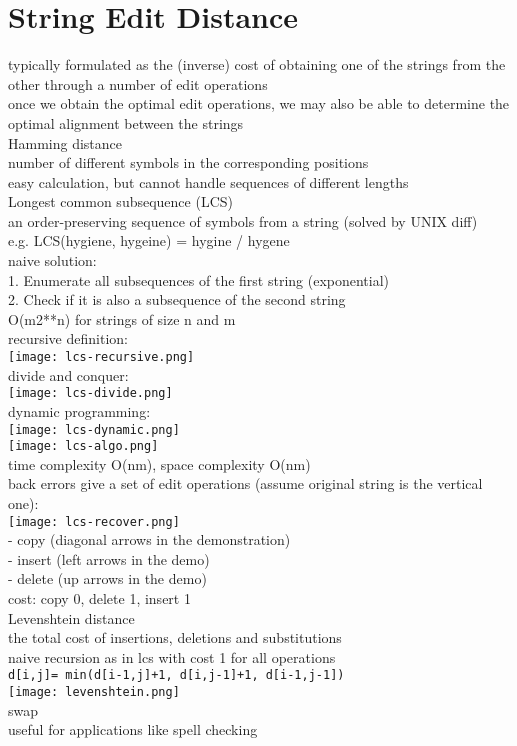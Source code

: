 \section{String Edit Distance}
{\tiny typically formulated as the (inverse) cost of obtaining one of the strings from the other through a number of edit operations \\
once we obtain the optimal edit operations, we may also be able to determine the optimal alignment between the strings}\\
\scriptsize{Hamming distance}\\ 
{\tiny number of different symbols in the corresponding positions\\
easy calculation, but cannot handle sequences of different lengths}\\
\scriptsize{Longest common subsequence (LCS)}\\
{\tiny an order-preserving sequence of symbols from a string (solved by UNIX diff)\\
e.g. LCS(hygiene, hygeine) = hygine / hygene\\
naive solution:\\
1. Enumerate all subsequences of the first string (exponential)\\
2. Check if it is also a subsequence of the second string\\
O(m2**n) for strings of size n and m\\
recursive definition:\\
\texttt{[image: lcs-recursive.png]}\\
divide and conquer:\\
\texttt{[image: lcs-divide.png]}\\
dynamic programming: \\
\texttt{[image: lcs-dynamic.png]}\\
\texttt{[image: lcs-algo.png]}\\
time complexity O(nm), space complexity O(nm)\\
back errors give a set of edit operations (assume original string is the vertical one):\\
\texttt{[image: lcs-recover.png]}\\
- copy (diagonal arrows in the demonstration)\\
- insert (left arrows in the demo)\\
- delete (up arrows in the demo)\\
cost: copy 0, delete 1, insert 1
}\\
\scriptsize{Levenshtein distance}\\
{\tiny the total cost of insertions, deletions and substitutions\\
naive recursion as in lcs with cost 1 for all operations\\
\texttt{d[i,j]= min(d[i-1,j]+1, d[i,j-1]+1, d[i-1,j-1])}\\
\texttt{[image: levenshtein.png]}
}\\
\scriptsize{swap}\\ {\tiny useful for applications like spell checking
}